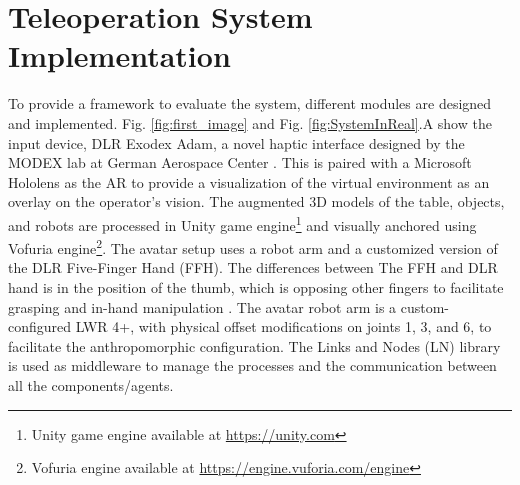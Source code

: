\documentclass[letterpaper, 10 pt, conference]{ieeeconf}  %
\begin{document}
\section{Teleoperation System Implementation}
\label{section:implementation}

To provide a framework to evaluate the system, different modules are designed and implemented. 
Fig. \ref{fig:first_image} and Fig. \ref{fig:SystemInReal}.A show the input device, DLR Exodex Adam, a novel haptic interface designed by the MODEX lab at German Aerospace Center \cite{p:Hapi,p:Exodex-Adam,p:Exodex-Prime}.
This is paired with a Microsoft Hololens as the AR to provide a visualization of the virtual environment as an overlay on the operator’s vision. The augmented 3D models of the table, objects, and robots are processed in Unity game engine\protect\footnote{Unity game engine available at \protect\url{https://unity.com}} and visually anchored using Vofuria engine\protect\footnote{Vofuria engine available at \protect\url{https://engine.vuforia.com/engine}}. The avatar setup uses a robot arm and a customized version of the DLR Five-Finger Hand (FFH)\cite{taskman}. The differences between The FFH and DLR hand is in the position of the thumb, which is opposing other fingers to facilitate grasping and in-hand manipulation \cite{dlr93720}. The avatar robot arm is a custom-configured LWR 4+, with physical offset modifications on joints 1, 3, and 6, to facilitate the anthropomorphic configuration. The Links and Nodes (LN) library is used as middleware to manage the processes and the communication between all the components/agents.
\end{document}
